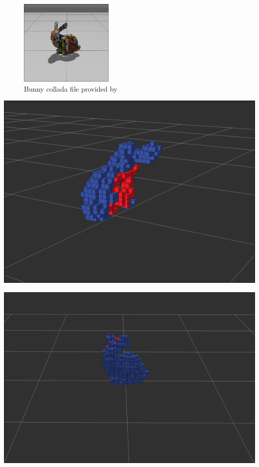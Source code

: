 \documentclass{beamer}
\begin{document}
\begin{frame}
	\vspace{-0.4cm}
	\begin{figure}
		\centering
		\includegraphics[width=0.4\textwidth]{Graphics/bunny.png}
		\caption{Bunny collada file provided by \cite{delmerico_comparison_2018}}
	\end{figure}
	\vspace{-0.2cm}
	\begin{minipage}{0.49\textwidth}
		\centering
		\includegraphics[width=\textwidth]{Graphics/voxel_side.png}
	\end{minipage}
	\hfill
	\begin{minipage}{0.49\textwidth}
		\includegraphics[width=\textwidth]{Graphics/voxel_front.png}
	\end{minipage}

\end{frame}
\end{document}
